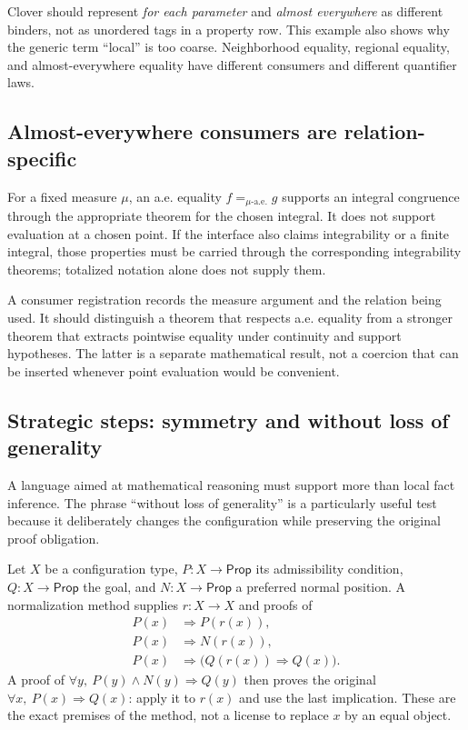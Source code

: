 \documentclass[11pt,a4paper]{article}
\newcommand{\Prop}{\mathsf{Prop}}
\theoremstyle{definition}
\theoremstyle{remark}
\begin{document}
Clover should represent \emph{for each parameter} and \emph{almost everywhere}
as different binders, not as unordered tags in a property row. This example
also shows why the generic term ``local'' is too coarse. Neighborhood equality,
regional equality, and almost-everywhere equality have different consumers and
different quantifier laws.

\subsection{Almost-everywhere consumers are relation-specific}

For a fixed measure $\mu$, an a.e. equality $f=_{\mu\text{-a.e.}}g$ supports
an integral congruence through the appropriate theorem for the chosen integral.
It does not support evaluation at a chosen point. If the interface also claims
integrability or a finite integral, those properties must be carried through
the corresponding integrability theorems; totalized notation alone does not
supply them.

A consumer registration records the measure argument and the relation being
used. It should distinguish a theorem that respects a.e. equality from a
stronger theorem that extracts pointwise equality under continuity and support
hypotheses. The latter is a separate mathematical result, not a coercion that
can be inserted whenever point evaluation would be convenient.

\subsection{Strategic steps: symmetry and without loss of generality}

A language aimed at mathematical reasoning must support more than local fact
inference. The phrase ``without loss of generality'' is a particularly useful
test because it deliberately changes the configuration while preserving the
original proof obligation.

Let $X$ be a configuration type, $P:X\to\Prop$ its admissibility condition,
$Q:X\to\Prop$ the goal, and $N:X\to\Prop$ a preferred normal position.
A normalization method supplies $r:X\to X$ and proofs of
\begin{align*}
 P(x)&\Rightarrow P(r(x)),\\
 P(x)&\Rightarrow N(r(x)),\\
 P(x)&\Rightarrow\bigl(Q(r(x))\Rightarrow Q(x)\bigr).
\end{align*}
A proof of $\forall y,\ P(y)\land N(y)\Rightarrow Q(y)$ then proves the
original $\forall x,\ P(x)\Rightarrow Q(x)$: apply it to $r(x)$ and use the
last implication. These are the exact premises of the method, not a license
to replace $x$ by an equal object.
\end{document}
